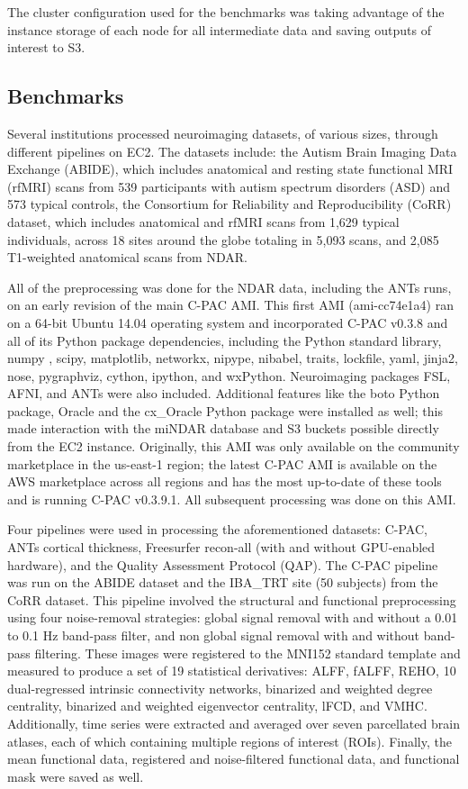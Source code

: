 \documentclass{frontiersSCNS} %
\begin{document}
The cluster configuration used for the benchmarks was taking advantage of the instance storage of each node for all intermediate data and saving outputs of interest to S3.

\subsection{Benchmarks}
Several institutions processed neuroimaging datasets, of various sizes, through different pipelines on EC2. The datasets include: the Autism Brain Imaging Data Exchange (ABIDE), which includes anatomical and resting state functional MRI (rfMRI) scans from 539 participants with autism spectrum disorders (ASD) and 573 typical controls, the Consortium for Reliability and Reproducibility (CoRR) dataset, which includes anatomical and rfMRI scans from 1,629 typical individuals, across 18 sites around the globe totaling in 5,093 scans, and 2,085 T1-weighted anatomical scans from NDAR.


All of the preprocessing was done for the NDAR data, including the ANTs runs, on an early revision of the main C-PAC AMI. This first AMI (ami-cc74e1a4) ran on a 64-bit Ubuntu 14.04 operating system and incorporated C-PAC v0.3.8 and all of its Python package dependencies, including the Python standard library, numpy , scipy, matplotlib, networkx, nipype, nibabel, traits, lockfile, yaml, jinja2, nose, pygraphviz, cython, ipython, and wxPython. Neuroimaging packages FSL, AFNI, and ANTs were also included. Additional features like the boto Python package, Oracle and the cx\_Oracle Python package were installed as well; this made interaction with the miNDAR database and S3 buckets possible directly from the EC2 instance. Originally, this AMI was only available on the community marketplace in the us-east-1 region; the latest C-PAC AMI is available on the AWS marketplace across all regions and has the most up-to-date of these tools and is running C-PAC v0.3.9.1. All subsequent processing was done on this AMI.


Four pipelines were used in processing the aforementioned datasets: C-PAC, ANTs cortical thickness, Freesurfer recon-all (with and without GPU-enabled hardware), and the Quality Assessment Protocol (QAP). The C-PAC pipeline was run on the ABIDE dataset and the IBA\_TRT site (50 subjects) from the CoRR dataset. This pipeline involved the structural and functional preprocessing using four noise-removal strategies: global signal removal with and without a 0.01 to 0.1 Hz band-pass filter, and non global signal removal with and without band-pass filtering. These images were registered to the MNI152 standard template and measured to produce a set of 19 statistical derivatives: ALFF, fALFF, REHO, 10 dual-regressed intrinsic connectivity networks, binarized and weighted degree centrality, binarized and weighted eigenvector centrality, lFCD, and VMHC. Additionally, time series were extracted and averaged over seven parcellated brain atlases, each of which containing multiple regions of interest (ROIs). Finally, the mean functional data, registered and noise-filtered functional data, and functional mask were saved as well.
\end{document}
